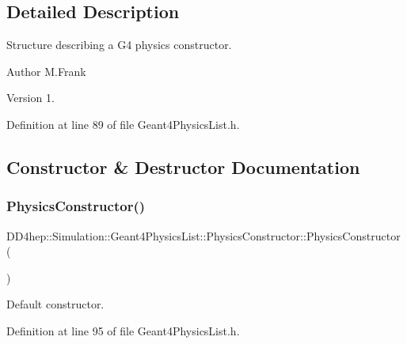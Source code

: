 \subsection{Detailed Description}
Structure describing a G4 physics constructor. 

\begin{DoxyAuthor}{Author}
M.\+Frank 
\end{DoxyAuthor}
\begin{DoxyVersion}{Version}
1. 
\end{DoxyVersion}


Definition at line 89 of file Geant4\+Physics\+List.\+h.



\subsection{Constructor \& Destructor Documentation}
\hypertarget{class_d_d4hep_1_1_simulation_1_1_geant4_physics_list_1_1_physics_constructor_a3c66a1cc69a9c2b3d8a4c2febcd17ceb}{}\label{class_d_d4hep_1_1_simulation_1_1_geant4_physics_list_1_1_physics_constructor_a3c66a1cc69a9c2b3d8a4c2febcd17ceb} 
\subsubsection{\texorpdfstring{Physics\+Constructor()}{PhysicsConstructor()}\hspace{0.1cm}{\footnotesize\ttfamily [1/3]}}
{\footnotesize\ttfamily D\+D4hep\+::\+Simulation\+::\+Geant4\+Physics\+List\+::\+Physics\+Constructor\+::\+Physics\+Constructor (\begin{DoxyParamCaption}{ }\end{DoxyParamCaption})\hspace{0.3cm}{\ttfamily [inline]}}



Default constructor. 



Definition at line 95 of file Geant4\+Physics\+List.\+h.

\hypertarget{class_d_d4hep_1_1_simulation_1_1_geant4_physics_list_1_1_physics_constructor_a6dd26f324ed74b412c93e8d555939c68}{}\label{class_d_d4hep_1_1_simulation_1_1_geant4_physics_list_1_1_physics_constructor_a6dd26f324ed74b412c93e8d555939c68} 
